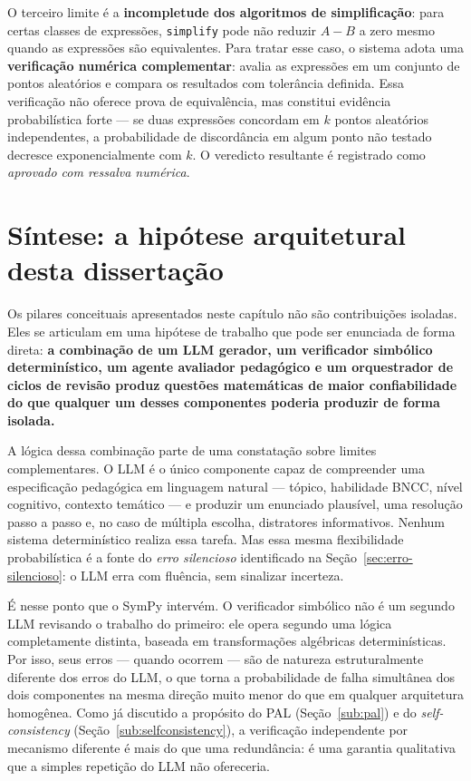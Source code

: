 O terceiro limite é a \textbf{incompletude dos algoritmos de simplificação}: para certas classes de
expressões, \texttt{simplify} pode não reduzir $A-B$ a zero mesmo quando as expressões são
equivalentes. Para tratar esse caso, o sistema adota uma \textbf{verificação numérica complementar}:
avalia as expressões em um conjunto de pontos aleatórios e compara os resultados com tolerância
definida. Essa verificação não oferece prova de equivalência, mas constitui evidência probabilística
forte --- se duas expressões concordam em $k$ pontos aleatórios independentes, a probabilidade de
discordância em algum ponto não testado decresce exponencialmente com $k$. O veredicto resultante é
registrado como \emph{aprovado com ressalva numérica}.

\section{Síntese: a hipótese arquitetural desta dissertação}
\label{sec:hipotese}


Os pilares conceituais apresentados neste capítulo não são contribuições isoladas. Eles se articulam
em uma hipótese de trabalho que pode ser enunciada de forma direta: \textbf{a combinação de um LLM
gerador, um verificador simbólico determinístico, um agente avaliador pedagógico e um orquestrador de
ciclos de revisão produz questões matemáticas de maior confiabilidade do que qualquer um desses
componentes poderia produzir de forma isolada.}

A lógica dessa combinação parte de uma constatação sobre limites complementares. O LLM é o único
componente capaz de compreender uma especificação pedagógica em linguagem natural --- tópico,
habilidade BNCC, nível cognitivo, contexto temático --- e produzir um enunciado plausível, uma
resolução passo a passo e, no caso de múltipla escolha, distratores informativos. Nenhum sistema
determinístico realiza essa tarefa. Mas essa mesma flexibilidade probabilística é a fonte do
\emph{erro silencioso} identificado na Seção~\ref{sec:erro-silencioso}: o LLM erra com fluência, sem
sinalizar incerteza.

É nesse ponto que o SymPy intervém. O verificador simbólico não é um segundo LLM revisando o trabalho
do primeiro: ele opera segundo uma lógica completamente distinta, baseada em transformações algébricas
determinísticas. Por isso, seus erros --- quando ocorrem --- são de natureza estruturalmente diferente
dos erros do LLM, o que torna a probabilidade de falha simultânea dos dois componentes na mesma
direção muito menor do que em qualquer arquitetura homogênea. Como já discutido a propósito do PAL
(Seção~\ref{sub:pal}) e do \emph{self-consistency} (Seção~\ref{sub:selfconsistency}), a verificação
independente por mecanismo diferente é mais do que uma redundância: é uma garantia qualitativa que a
simples repetição do LLM não ofereceria.

